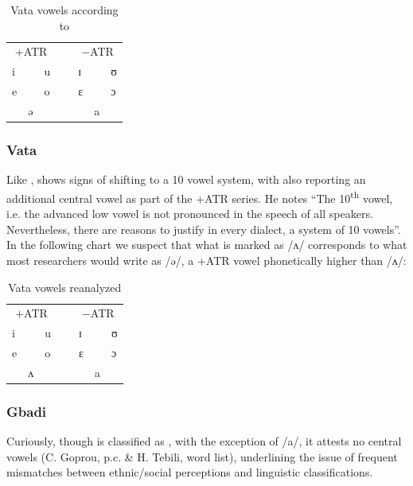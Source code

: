 \documentclass[output=paper,newtxmath,modfonts,nonflat]{langsci/langscibook}
\begin{document}
\begin{table}
\caption{Vata vowels according to \citet{Kaye1980}}	
\label{tab:zogbo:14}
\begin{tabular}{lllllll}
\multicolumn{3}{c}{+ATR} && \multicolumn{3}{c}{−ATR}\\ 
i  &&  u  &~&  ɪ  &&  ʊ\\

e  &&  o  &&  ɛ  &&  ɔ\\

& ə   &&&&     a \\
	\end{tabular}
\end{table}

\subsubsection{Vata}
Like ,  shows signs of shifting to a 10 vowel system, with \citet[70]{Kaye1980} also reporting an additional central vowel as part of the +ATR series. He notes “The 10\textsuperscript{th} vowel, i.e. the advanced low vowel is not pronounced in the speech of all  speakers.  Nevertheless, there are reasons to justify in every  dialect, a system of 10 vowels”. In the following chart we suspect that what is marked as /ʌ/ corresponds to what most  researchers would write as /ə/, a  +ATR vowel phonetically higher than /ʌ/:


\begin{table}
\caption{Vata vowels reanalyzed}	
\label{tab:zogbo:15}
\begin{tabular}{lllllll}
\multicolumn{3}{c}{+ATR} && \multicolumn{3}{c}{−ATR}\\ 
i  &&  u  &~&  ɪ  &&  ʊ\\

e  &&  o  &&  ɛ  &&  ɔ\\

& ʌ   &&&&     a \\
	\end{tabular}
\end{table}

\subsubsection{Gbadi} Curiously, though  is classified as , with the exception of /a/, it attests no central vowels (C. Goprou, p.c. \& H. Tebili, word list), underlining the issue of frequent mismatches between ethnic/social perceptions and linguistic classifications. 
\end{document}
